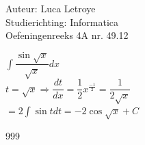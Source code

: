 \documentclass[a4paper]{article}
\newcommand{\dint}{\displaystyle\int}
\begin{document}
  
\noindent \large Auteur: Luca Letroye \\
\noindent \large Studierichting: Informatica\\
\noindent \large Oefeningenreeks 4A nr. 49.12

\medskip
\normalsize

$\dint\dfrac{\sin\sqrt{x}}{\sqrt{x}}dx$\\

$t = \sqrt{x} \Rightarrow \dfrac{dt}{dx} = \dfrac{1}{2}x^{\tfrac{-1}{2}} = \dfrac{1}{2\sqrt{x}}$\\

$= 2\dint \sin t dt = -2\cos\sqrt{x} +C $\\


\begin{thebibliography}{999}
\end{thebibliography}
\end{document}
